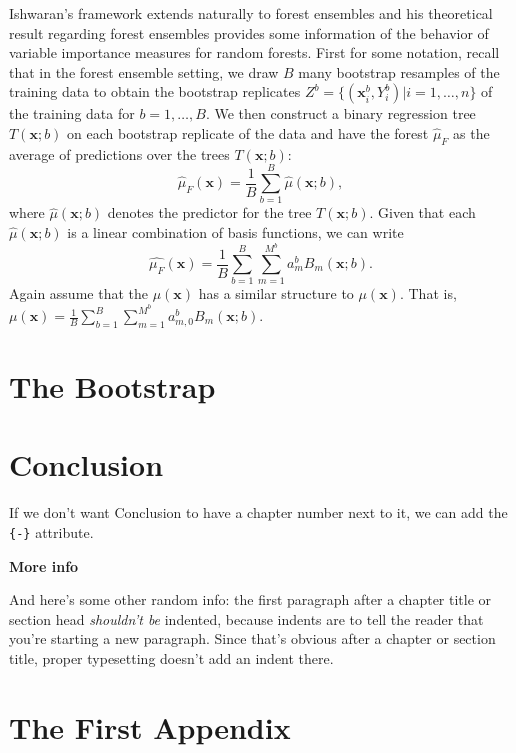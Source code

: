 \documentclass[12pt,twoside]{reedthesis}
\theoremstyle{definition}
\theoremstyle{definition}
\theoremstyle{definition}
\theoremstyle{remark}
\begin{document}
Ishwaran's framework extends naturally to forest ensembles and his
theoretical result regarding forest ensembles provides some information
of the behavior of variable importance measures for random forests.
First for some notation, recall that in the forest ensemble setting, we
draw \(B\) many bootstrap resamples of the training data to obtain the
bootstrap replicates \(Z^{b}=\{(\mathbf{x}_i^b, Y_i^b)|i=1,\ldots,n\}\)
of the training data for \(b=1,\ldots, B\). We then construct a binary
regression tree \(T(\mathbf{x};b)\) on each bootstrap replicate of the
data and have the forest \(\hat{\mu}_F\) as the average of predictions
over the trees \(T(\mathbf{x};b)\):
\[\hat{\mu}_F(\mathbf{x})=\frac{1}{B}\sum_{b=1}^B \hat{\mu}(\mathbf{x};b),\]
where \(\hat{\mu}(\mathbf{x};b)\) denotes the predictor for the tree
\(T(\mathbf{x};b)\). Given that each \(\hat{\mu}(\mathbf{x};b)\) is a
linear combination of basis functions, we can write
\[\hat{\mu_F}(\mathbf{x})=\frac{1}{B}\sum_{b=1}^B\sum_{m=1}^{M^b}a_m^b B_m(\mathbf{x};b).\]
Again assume that the \(\mu(\mathbf{x})\) has a similar structure to
\(\mu(\mathbf{x})\). That is,
\(\mu(\mathbf{x})=\frac{1}{B}\sum_{b=1}^B\sum_{m=1}^{M^b}a_{m,0}^b B_m(\mathbf{x};b)\).

\chapter{The Bootstrap}\label{the-bootstrap}

\chapter*{Conclusion}\label{conclusion}

If we don't want Conclusion to have a chapter number next to it, we can
add the \texttt{\{-\}} attribute.

\textbf{More info}

And here's some other random info: the first paragraph after a chapter
title or section head \emph{shouldn't be} indented, because indents are
to tell the reader that you're starting a new paragraph. Since that's
obvious after a chapter or section title, proper typesetting doesn't add
an indent there.

\appendix

\chapter{The First Appendix}\label{the-first-appendix}
\end{document}
